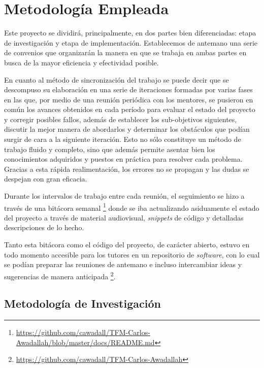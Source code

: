 \section{Metodología Empleada}

Este proyecto se dividirá, principalmente, en dos partes bien diferenciadas: etapa de investigación y etapa de implementación. Establecemos de antemano una serie de convenios que organizarán la manera en que se trabaja en ambas partes en busca de la mayor eficiencia y efectividad posible.

En cuanto al método de sincronización del trabajo se puede decir que se descompuso su elaboración en una serie de iteraciones formadas por varias fases en las que, por medio de una reunión periódica con los mentores, se pusieron en común los avances obtenidos en cada período para evaluar el estado del proyecto y corregir posibles fallos, además de establecer los sub-objetivos siguientes, discutir la mejor manera de abordarlos y determinar los obstáculos que podían surgir de cara a la siguiente iteración. Esto no sólo constituye un método de trabajo fluido y completo, sino que además permite asentar bien los conocimientos adquiridos y puestos en práctica para resolver cada problema. Gracias a esta rápida realimentación, los errores no se propagan y las dudas se despejan con gran eficacia.

Durante los intervalos de trabajo entre cada reunión, el seguimiento se hizo a través de una bitácora semanal \footnote{\url{https://github.com/cawadall/TFM-Carlos-Awadallah/blob/master/docs/README.md}} donde se iba actualizando asiduamente el estado del proyecto a través de material audiovisual, \textit{snippets} de código y detalladas descripciones de lo hecho.

Tanto esta bitácora como el código del proyecto, de carácter abierto, estuvo en todo momento accesible para los tutores en un repositorio de \textit{software}, con lo cual se podían preparar las reuniones de antemano e incluso intercambiar ideas y sugerencias de manera anticipada \footnote{\url{https://github.com/cawadall/TFM-Carlos-Awadallah}}.

\subsection{Metodología de Investigación}

